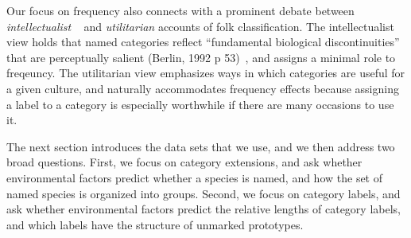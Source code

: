 \documentclass[10pt,letterpaper]{article}
\begin{document}
Our focus on frequency also connects with a prominent debate between \emph{intellectualist} ~\cite{berlin2014ethnobiological} and \emph{utilitarian} \cite{hunn1982utilitarian} accounts of folk classification. The intellectualist view holds that named categories reflect ``fundamental biological discontinuities'' that are perceptually salient (Berlin, 1992 p 53)~\nocite{berlin2014ethnobiological}, and assigns a minimal role to freqeuncy. The utilitarian view emphasizes ways in which categories are useful for a given culture, and naturally accommodates frequency effects because assigning a label to a category is especially worthwhile if there are many occasions to use it.

The next section introduces the data sets that we use, and we then address two broad questions. First, we focus on category extensions, and ask whether environmental factors predict whether a species is named, and how the set of named species is organized into groups. Second, we focus on category labels, and ask whether environmental factors predict the relative lengths of category labels, and which labels have the structure of unmarked prototypes. 






\end{document}
